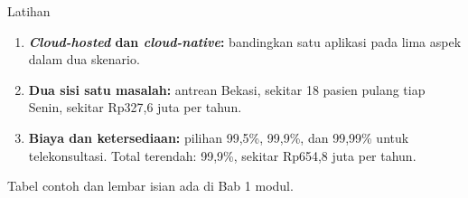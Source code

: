 \documentclass[aspectratio=169, table, 12pt]{beamer}
\begin{document}
\begin{frame}{Latihan}
  \begin{enumerate}
    \item \textbf{\textit{Cloud-hosted} dan \textit{cloud-native}:} bandingkan
          satu aplikasi pada lima aspek dalam dua skenario.
    \item \textbf{Dua sisi satu masalah:} antrean Bekasi, sekitar 18 pasien pulang
          tiap Senin, sekitar Rp327,6 juta per tahun.
    \item \textbf{Biaya dan ketersediaan:} pilihan 99,5\%, 99,9\%, dan 99,99\% untuk
          telekonsultasi. Total terendah: 99,9\%, sekitar Rp654,8 juta per tahun.
  \end{enumerate}
  \vspace{4pt}
  {\small Tabel contoh dan lembar isian ada di Bab 1 modul.}
\end{frame}
\end{document}
